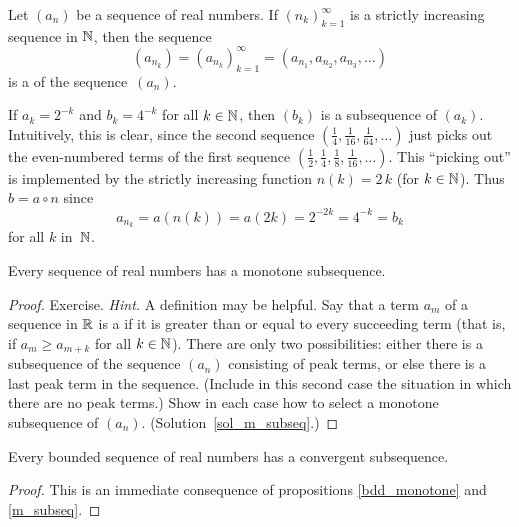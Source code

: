 \begin{defn}\label{subseq_r} Let $(a_n)$ be a sequence of real numbers. If
$\left(n_k\right)_{k=1}^\infty$ is a strictly increasing sequence in $\mathbb{N}$, then the sequence
   \[\left(a_{n_k}\right) = \left(a_{n_k}\right)_{k=1}^\infty =
                       \left(a_{n_1}, a_{n_2}, a_{n_3}, \dots \right)\]
is a
 of the sequence~$(a_n)$.
\end{defn}

\begin{exam} If $a_k = 2^{-k}$ and $b_k = 4^{-k}$ for all $k \in \mathbb{N}$, then $(b_k)$ is a subsequence
of $(a_k)$. Intuitively, this is clear, since the second sequence $(\frac14, \frac1{16},
\frac1{64}, \dots )$ just picks out the even-numbered terms of the first sequence $(\frac12,
\frac14, \frac18, \frac1{16}, \dots )$.  This ``picking out'' is implemented by the strictly
increasing function $n(k) = 2\,k$ (for $k \in \mathbb{N}$). Thus $b = a \circ n$ since
   \[a_{n_k} = a(n(k)) = a(2k) = 2^{-2k} = 4^{-k} = b_k\]
for all $k$ in~$\mathbb{N}$.
\end{exam}

\begin{prop}\label{m_subseq} Every sequence of real numbers has a monotone subsequence.
\end{prop}

\begin{proof} Exercise. \emph{Hint.}  A definition may be helpful. Say that a term $a_m$ of a
sequence in $\mathbb{R}$ is a
 if it is greater than or equal to every succeeding term (that is, if $a_m \ge
a_{m+k}$ for all $k \in \mathbb{N}$). There are only two possibilities: either there is a subsequence
of the sequence $(a_n)$ consisting of peak terms, or else there is a last peak term in the
sequence. (Include in this second case the situation in which there are no peak terms.) Show
in each case how to select a monotone subsequence of $(a_n)$.  (Solution~\ref{sol_m_subseq}.)
\ns
\end{proof}

\begin{cor}\label{bdd_convss} Every bounded sequence of real numbers has a convergent subsequence.
\end{cor}

\begin{proof} This is an immediate consequence of propositions \ref{bdd_monotone} and \ref{m_subseq}.
\end{proof}

